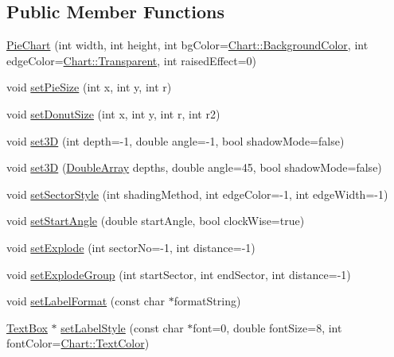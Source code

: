 \subsection*{Public Member Functions}
\begin{DoxyCompactItemize}
\item 
\hyperlink{class_pie_chart_a3d19f7488d8cb9ffea3a112ad689d15c}{Pie\+Chart} (int width, int height, int bg\+Color=\hyperlink{namespace_chart_abee0d882fdc9ad0b001245ad9fc64011a134193bde693b9d152d0c6dc59fa7d7f}{Chart\+::\+Background\+Color}, int edge\+Color=\hyperlink{namespace_chart_abee0d882fdc9ad0b001245ad9fc64011afc6811800a9e2582dac0157b6279f836}{Chart\+::\+Transparent}, int raised\+Effect=0)
\item 
void \hyperlink{class_pie_chart_a6e1938c8559b2eee0b3a0f97708105fc}{set\+Pie\+Size} (int x, int y, int r)
\item 
void \hyperlink{class_pie_chart_a142e2140586f2462f74a4eaf9ee6739c}{set\+Donut\+Size} (int x, int y, int r, int r2)
\item 
void \hyperlink{class_pie_chart_aea66f80b6f025b2abdff9c768de1d32c}{set3D} (int depth=-\/1, double angle=-\/1, bool shadow\+Mode=false)
\item 
void \hyperlink{class_pie_chart_abf15c0001e392b137edb80397a2af0a4}{set3D} (\hyperlink{class_double_array}{Double\+Array} depths, double angle=45, bool shadow\+Mode=false)
\item 
void \hyperlink{class_pie_chart_aafa4b3350c1242f624c99fad5fbb3883}{set\+Sector\+Style} (int shading\+Method, int edge\+Color=-\/1, int edge\+Width=-\/1)
\item 
void \hyperlink{class_pie_chart_a3a0283233ab280df46c79c25d0770437}{set\+Start\+Angle} (double start\+Angle, bool clock\+Wise=true)
\item 
void \hyperlink{class_pie_chart_a0c4c811dad237d549fc5461a51109a1a}{set\+Explode} (int sector\+No=-\/1, int distance=-\/1)
\item 
void \hyperlink{class_pie_chart_a48bc655eb7a303cf3083da3a494b60d9}{set\+Explode\+Group} (int start\+Sector, int end\+Sector, int distance=-\/1)
\item 
void \hyperlink{class_pie_chart_adc0379ce4654443993084784745bf3ad}{set\+Label\+Format} (const char $\ast$format\+String)
\item 
\hyperlink{class_text_box}{Text\+Box} $\ast$ \hyperlink{class_pie_chart_a7881b5842d44d84aed560a1da2b33126}{set\+Label\+Style} (const char $\ast$font=0, double font\+Size=8, int font\+Color=\hyperlink{namespace_chart_abee0d882fdc9ad0b001245ad9fc64011a879e14f2f5024caccc047374342321ef}{Chart\+::\+Text\+Color})

\end{DoxyCompactItemize}
